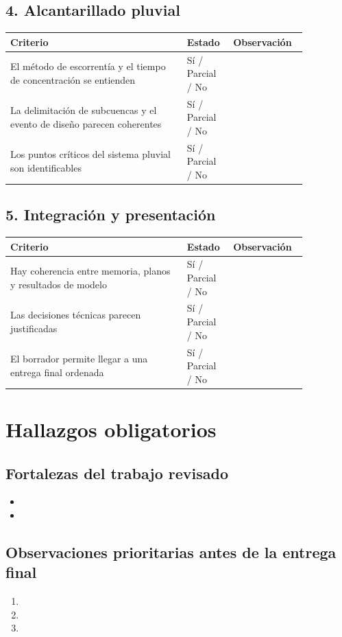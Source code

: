 \documentclass[11pt]{article}
\begin{document}
\subsection*{4. Alcantarillado pluvial}
\begin{tabular}{p{0.54\linewidth} p{0.12\linewidth} p{0.20\linewidth}}
\toprule
\textbf{Criterio} & \textbf{Estado} & \textbf{Observaci\'on} \\
\midrule
El m\'etodo de escorrent\'ia y el tiempo de concentraci\'on se entienden & S\'i / Parcial / No & \\
La delimitaci\'on de subcuencas y el evento de dise\~no parecen coherentes & S\'i / Parcial / No & \\
Los puntos cr\'iticos del sistema pluvial son identificables & S\'i / Parcial / No & \\
\bottomrule
\end{tabular}

\subsection*{5. Integraci\'on y presentaci\'on}
\begin{tabular}{p{0.54\linewidth} p{0.12\linewidth} p{0.20\linewidth}}
\toprule
\textbf{Criterio} & \textbf{Estado} & \textbf{Observaci\'on} \\
\midrule
Hay coherencia entre memoria, planos y resultados de modelo & S\'i / Parcial / No & \\
Las decisiones t\'ecnicas parecen justificadas & S\'i / Parcial / No & \\
El borrador permite llegar a una entrega final ordenada & S\'i / Parcial / No & \\
\bottomrule
\end{tabular}

\section{Hallazgos obligatorios}
\subsection*{Fortalezas del trabajo revisado}
\begin{itemize}
\item
\item
\end{itemize}

\subsection*{Observaciones prioritarias antes de la entrega final}
\begin{enumerate}
\item
\item
\item
\end{enumerate}
\end{document}
